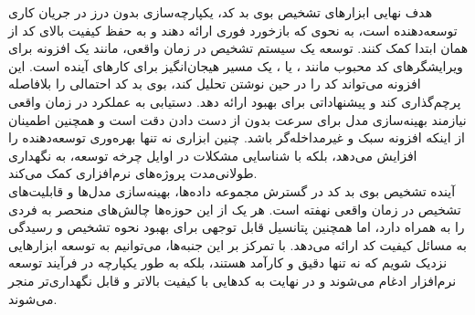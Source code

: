 هدف نهایی ابزارهای تشخیص بوی بد کد، یکپارچه‌سازی بدون درز در جریان کاری توسعه‌دهنده است، به نحوی که بازخورد فوری ارائه دهند و به حفظ کیفیت بالای کد از همان ابتدا کمک کنند. توسعه یک سیستم تشخیص در زمان واقعی، مانند یک افزونه برای ویرایشگرهای کد محبوب مانند ،  یا ، یک مسیر هیجان‌انگیز برای کارهای آینده است. این افزونه می‌تواند کد را در حین نوشتن تحلیل کند، بوی بد کد احتمالی را بلافاصله پرچم‌گذاری کند و پیشنهاداتی برای بهبود ارائه دهد. دستیابی به عملکرد در زمان واقعی نیازمند بهینه‌سازی مدل برای سرعت بدون از دست دادن دقت است و همچنین اطمینان از اینکه افزونه سبک و غیرمداخله‌گر باشد. چنین ابزاری نه تنها بهره‌وری توسعه‌دهنده را افزایش می‌دهد، بلکه با شناسایی مشکلات در اوایل چرخه توسعه، به نگهداری طولانی‌مدت پروژه‌های نرم‌افزاری کمک می‌کند.
\\
آینده تشخیص بوی بد کد در گسترش مجموعه داده‌ها، بهینه‌سازی مدل‌ها و قابلیت‌های تشخیص در زمان واقعی نهفته است. هر یک از این حوزه‌ها چالش‌های منحصر به فردی را به همراه دارد، اما همچنین پتانسیل قابل توجهی برای بهبود نحوه تشخیص و رسیدگی به مسائل کیفیت کد ارائه می‌دهد. با تمرکز بر این جنبه‌ها، می‌توانیم به توسعه ابزارهایی نزدیک شویم که نه تنها دقیق و کارآمد هستند، بلکه به طور یکپارچه در فرآیند توسعه نرم‌افزار ادغام می‌شوند و در نهایت به کدهایی با کیفیت بالاتر و قابل نگهداری‌تر منجر می‌شوند.
\clearpage
